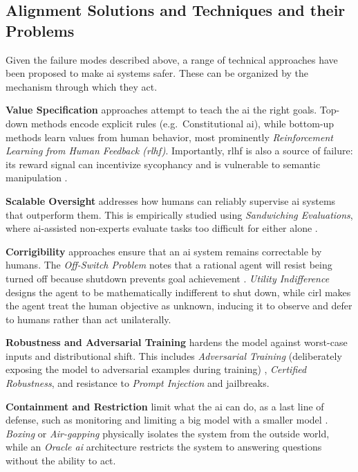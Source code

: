 \begin{toreview}
	\section{Alignment Solutions and Techniques and their Problems}\label{sec:solutions}

	Given the failure modes described above, a range of technical approaches have been proposed to make \gls{ai} systems safer. These can be organized by the mechanism through which they act.

	\textbf{Value Specification} approaches attempt to teach the \gls{ai} the right goals. Top-down methods encode explicit rules (e.g.\ Constitutional \gls{ai}), while bottom-up methods learn values from human behavior, most prominently \textit{Reinforcement Learning from Human Feedback (\gls{rlhf})}. Importantly, \gls{rlhf} is also a source of failure: its reward signal can incentivize sycophancy \cite{sharma2024sycophancy} and is vulnerable to semantic manipulation \cite{mcintosh_inadequacy_2024}.


	\textbf{Scalable Oversight} addresses how humans can reliably supervise \gls{ai} systems that outperform them. This is empirically studied using \textit{Sandwiching Evaluations}, where \gls{ai}-assisted non-experts evaluate tasks too difficult for either alone \cite{bowman2022measuring}. %

	\textbf{Corrigibility} approaches ensure that an \gls{ai} system remains correctable by humans. The \textit{Off-Switch Problem} notes that a rational agent will resist being turned off because shutdown prevents goal achievement \cite{bostrom2012superintelligent}. \textit{Utility Indifference} designs the agent to be mathematically indifferent to shut down, while \gls{cirl} makes the agent treat the human objective as unknown, inducing it to observe and defer to humans rather than act unilaterally.

	\textbf{Robustness and Adversarial Training} hardens the model against worst-case inputs and distributional shift. This includes \textit{Adversarial Training} (deliberately exposing the model to adversarial examples during training) \cite{goodfellow2015explaining}, \textit{Certified Robustness}, and resistance to \textit{Prompt Injection} and jailbreaks.

	\textbf{Containment and Restriction} limit what the \gls{ai} can do, as a last line of defense, such as monitoring and limiting a big model with a smaller model \cite{greenblatt2023aicontrol}. \textit{Boxing} or \textit{Air-gapping} physically isolates the system from the outside world, while an \textit{Oracle \gls{ai}} architecture restricts the system to answering questions without the ability to act.


\end{toreview}
